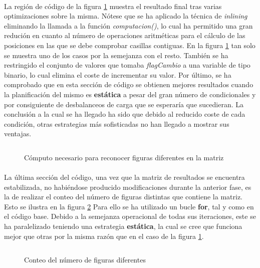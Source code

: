 \documentclass[10pt, a4paper,spanish]{article}
\begin{document}
		\paragraph{}
		La región de código de la figura \ref{code:op_3} muestra el resultado final tras varias optimizaciones sobre la misma. Nótese que se ha aplicado la técnica de \emph{inlining} eliminando la llamada a la función \emph{computacion()}, lo cual ha permitido una gran redución en cuanto al número de operaciones aritméticas para el cálculo de las posiciones en las que se debe comprobar casillas contiguas. En la figura \ref{code:op_3} tan solo se muestra uno de los casos por la semejanza con el resto. También se ha restringido el conjunto de valores que tomaba \emph{flagCambio} a una variable de tipo binario, lo cual elimina el coste de incrementar su valor. Por último, se ha comprobado que en esta sección de código se obtienen mejores resultados cuando la planificación del mismo es \textbf{estática} a pesar del gran número de condicionales y por consiguiente de desbalanceos de carga que se esperaría que sucedieran. La conclusión a la cual se ha llegado ha sido que debido al reducido coste de cada condición, otras estrategias más sofisticadas no han llegado a mostrar sus ventajas.

		\begin{figure}[H]
			\centering
			\inputminted{c}{./code/op3.c}
			\caption{Cómputo necesario para reconocer figuras diferentes en la matriz}
			\label{code:op_3}
		\end{figure}

		\paragraph{}
		La última sección del código, una vez que la matriz de resultados se encuentra estabilizada, no habiéndose producido modificaciones durante la anterior fase, es la de realizar el conteo del número de figuras distintas que contiene la matriz. Esto se ilustra en la figura \ref{code:op_4} Para ello se ha utilizado un bucle \textbf{for}, tal y como en el código base. Debido a la semejanza operacional de todas sus iteraciones, este se ha paralelizado teniendo una estrategia \textbf{estática}, la cual se cree que funciona mejor que otras por la misma razón que en el caso de la figura \ref{code:op_3}.

		\begin{figure}[H]
			\centering
			\inputminted{c}{./code/op4.c}
			\caption{Conteo del número de figuras diferentes}
			\label{code:op_4}
		\end{figure}
\end{document}
